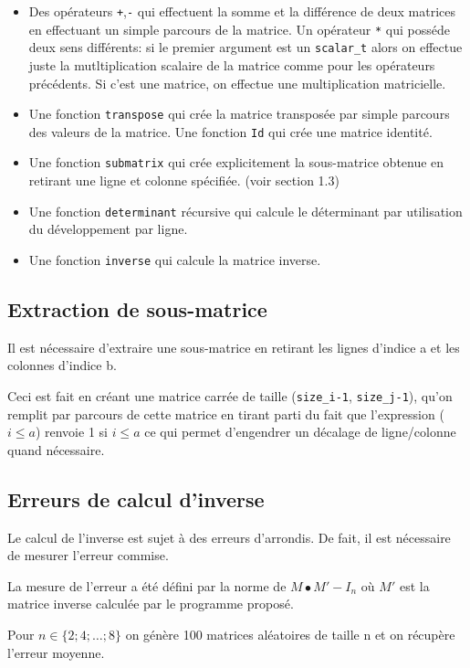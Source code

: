 \documentclass[a4paper,11pt]{article}
\begin{document}
\begin{itemize}
\item Des opérateurs \texttt{+},\texttt{-} qui effectuent la somme et la différence de deux matrices en effectuant un simple parcours de la matrice. Un opérateur \texttt{*} qui posséde deux sens différents: si le premier argument est un \texttt{scalar\_t} alors on effectue juste la mutltiplication scalaire de la matrice comme pour les opérateurs précédents. Si c'est une matrice, on effectue une multiplication matricielle.
\item Une fonction \texttt{transpose} qui crée la matrice transposée par simple parcours des valeurs de la matrice. Une fonction \texttt{Id} qui crée une matrice identité.
\item Une fonction \texttt{submatrix} qui crée explicitement la sous-matrice obtenue en retirant une ligne et colonne spécifiée. (voir section 1.3)
\item Une fonction \texttt{determinant} récursive qui calcule le déterminant par utilisation du développement par ligne.
\item Une fonction \texttt{inverse} qui calcule la matrice inverse.
\end{itemize}

\subsection{Extraction de sous-matrice}

Il est nécessaire d'extraire une sous-matrice en retirant les lignes d'indice a et les colonnes d'indice b. 

Ceci est fait en créant une matrice carrée de taille (\texttt{size\_i-1}, \texttt{size\_j-1}), qu'on remplit par parcours de cette matrice en tirant parti du fait que l'expression
($i \leq a$) renvoie 1 si $i \leq a$ ce qui permet d'engendrer un décalage de ligne/colonne quand nécessaire.

\subsection{Erreurs de calcul d'inverse}

Le calcul de l'inverse est sujet à des erreurs d'arrondis. De fait, il est nécessaire de mesurer l'erreur commise.

La mesure de l'erreur a été défini par la norme de $M\bullet M' - I_n$ où $M'$ est la matrice inverse calculée par le programme proposé.

Pour $n \in \{2;4;\dots;8\}$ on génère 100 matrices aléatoires de taille n et on récupère l'erreur moyenne.
\end{document}
